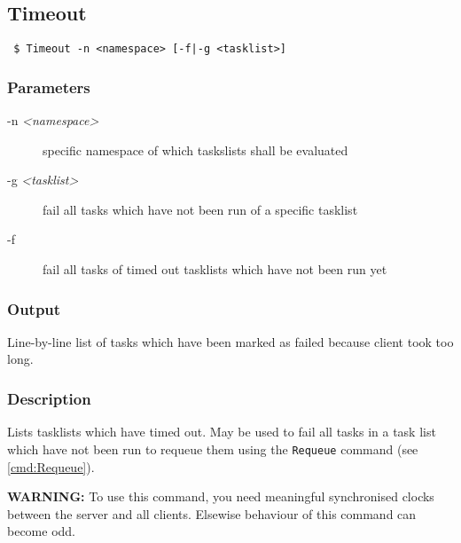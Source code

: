 \documentclass[a4paper,11pt]{article}
\begin{document}
\newpage

\subsection{Timeout\label{cmd:Timeout}}
\begin{verbatim}
 $ Timeout -n <namespace> [-f|-g <tasklist>]
\end{verbatim}

\subsubsection{Parameters}
\begin{description}
\item[-n \textit{<namespace>}] specific namespace of which taskslists shall be evaluated 
\item[-g \textit{<tasklist>}] fail all tasks which have not been run of a specific tasklist
\item[-f] fail all tasks of timed out tasklists which have not been run yet
\end{description}

\subsubsection{Output}
Line-by-line list of tasks which have been marked as failed because client took too long.

\subsubsection{Description}
Lists tasklists which have timed out. May be used to fail all tasks in a task list which have not been run to requeue them using the \texttt{Requeue} command (see \ref{cmd:Requeue}).

\textbf{WARNING:} To use this command, you need meaningful synchronised clocks between the server and all clients. Elsewise behaviour of this command can become odd.

%
%
%
%



%
%
%
%
\end{document}
